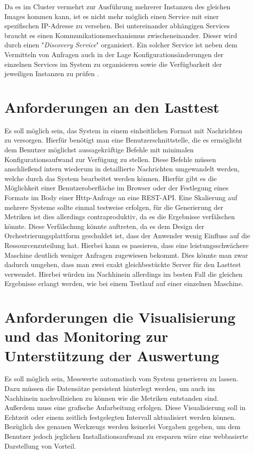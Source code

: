 Da es im Cluster vermehrt zur Ausführung mehrerer Instanzen des gleichen Images kommen kann, ist es nicht mehr möglich einen Service mit einer spezifischen IP-Adresse zu versehen. Bei untereinander abhängigen Services braucht es einen Kommunikationsmechanismus zwischeneinander. Dieser wird durch einen "\emph{Discovery Service}" organisiert. Ein solcher Service ist neben dem Vermitteln von Anfragen auch in der Lage Konfigurationsänderungen der einzelnen Services im System zu organisieren sowie die Verfügbarkeit der jeweiligen Instanzen zu prüfen \cite[Seite~45 ff.]{soppelsaswarm}.

\newpage

\section{Anforderungen an den Lasttest}
Es soll möglich sein, das System in einem einheitlichen Format mit Nachrichten zu versorgen. Hierfür benötigt man eine Benutzerschnittstelle, die es ermöglicht dem Benutzer möglichst aussagekräftige Befehle mit minimalen Konfigurationsaufwand zur Verfügung zu stellen. Diese Befehle müssen anschließend intern wiederum in detaillierte Nachrichten umgewandelt werden, welche durch das System bearbeitet werden können. Hierfür gibt es die Möglichkeit einer Benutzeroberfläche im Browser oder der Festlegung eines Formats im Body einer Http-Anfrage an eine REST-API. Eine Skalierung auf mehrere Systeme sollte einmal testweise erfolgen, für die Generierung der Metriken ist dies allerdings contraproduktiv, da es die Ergebnisse verfälschen könnte. Diese Verfälschung könnte auftreten, da es dem Design der Orchestrierungsplattform geschuldet ist, dass der Anwender wenig Einfluss auf die Ressourcenzuteilung hat. Hierbei kann es passieren, dass eine leistungsschwächere Maschine deutlich weniger Anfragen zugewiesen bekommt. Dies könnte man zwar dadurch umgehen, dass man zwei exakt gleichbestückte Server für den Lasttest verwendet. Hierbei würden im Nachhinein allerdings im besten Fall die gleichen Ergebnisse erlangt werden, wie bei einem Testlauf auf einer einzelnen Maschine.

\section{Anforderungen die Visualisierung und das Monitoring zur Unterstützung der Auswertung}
Es soll möglich sein, Messwerte automatisch vom System generieren zu lassen. Dazu müssen die Datensätze persistent hinterlegt werden, um auch im Nachhinein nachvollziehen zu können wie die Metriken entstanden sind. Außerdem muss eine grafische Aufarbeitung erfolgen. Diese Visualisierung soll in Echtzeit oder einem zeitlich festgelegten Intervall aktualisiert werden können. Bezüglich des genauen Werkzeugs werden keinerlei Vorgaben gegeben, um dem Benutzer jedoch jeglichen Installationsaufwand zu ersparen wäre eine webbasierte Darstellung von Vorteil.

